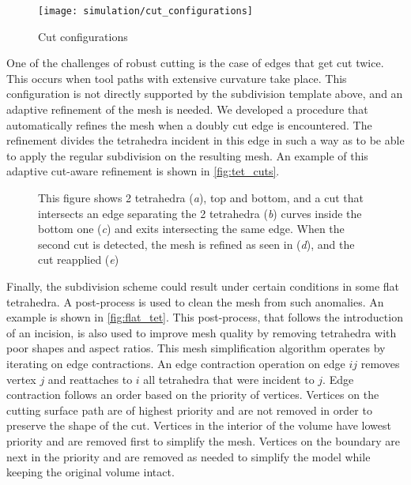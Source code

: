 \begin{figure}
  \centering%
  \texttt{[image: simulation/cut\_configurations]}
  \caption{Cut configurations}
  \label{fig:discontinuous_tetrahedra_fem}
\end{figure}


One of the challenges of robust cutting is the case of edges that get cut twice. This occurs when tool paths with extensive curvature take place. This configuration is not directly supported by the subdivision template above, and an adaptive refinement of the mesh is needed. We developed a procedure that automatically refines the mesh when a doubly cut edge is encountered. The refinement divides the tetrahedra incident in this edge in such a way as to be able to apply the regular subdivision on the resulting mesh.  An example of this adaptive cut-aware refinement is shown in \autoref{fig:tet_cuts}.

\begin{figure}
  \centering%
  \hfill%
  \hfill%
  \hfill%
  \hfill%
  \caption{This figure shows 2 tetrahedra (\emph{a}), top and bottom, and a cut that intersects an edge separating the 2 tetrahedra (\emph{b}) curves inside the bottom one (\emph{c}) and exits intersecting the same edge. When the second cut is detected, the mesh is refined as seen in (\emph{d}), and the cut reapplied (\emph{e})}
  \label{fig:tet_cuts}
\end{figure}


Finally, the subdivision scheme could result under certain conditions in some flat tetrahedra. A post-process is used to clean the mesh from such anomalies. An example is shown in \autoref{fig:flat_tet}. This post-process, that follows the introduction of an incision, is also used to improve mesh quality by removing tetrahedra with poor shapes and aspect ratios. This mesh simplification algorithm operates by iterating on edge contractions. An edge contraction operation on edge $ij$ removes vertex $j$ and reattaches to $i$ all tetrahedra that were incident to $j$. Edge contraction follows an order based on the priority of vertices. Vertices on the cutting surface path are of highest priority and are not removed in order to preserve the shape of the cut. Vertices in the interior of the volume have lowest priority and are removed first to simplify the mesh. Vertices on the boundary are next in the priority and are removed as needed to simplify the model while keeping the original volume intact.


